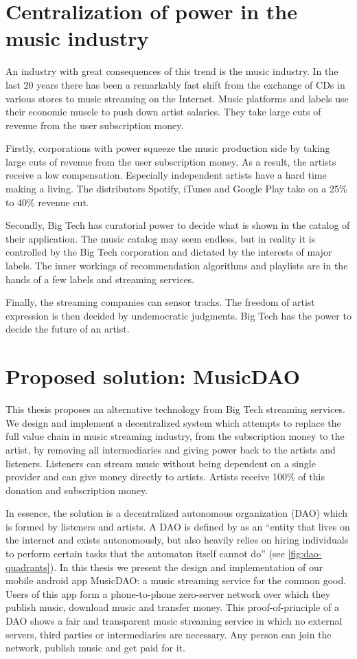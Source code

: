 \section{Centralization of power in the music industry}
An industry with great consequences of this trend is the music industry. In the last 20 years there has been a remarkably fast shift from the exchange of CDs in various stores to music streaming on the Internet. Music platforms and labels use their economic muscle to push down artist salaries. They take large cuts of revenue from the user subscription money.

Firstly, corporations with power squeeze the music production side by taking large cuts of revenue from the user subscription money. As a result, the artists receive a low compensation. Especially independent artists have a hard time making a living. The distributors Spotify, iTunes and Google Play take on a 25\% to 40\% revenue cut.

Secondly, Big Tech has curatorial power to decide what is shown in the catalog of their application. The music catalog may seem endless, but in reality it is controlled by the Big Tech corporation and dictated by the interests of major labels. The inner workings of recommendation algorithms and playlists are in the hands of a few labels and streaming services.

Finally, the streaming companies can sensor tracks. The freedom of artist expression is then decided by undemocratic judgments. Big Tech has the power to decide the future of an artist.

\section{Proposed solution: MusicDAO}
This thesis proposes an alternative technology from Big Tech streaming services. We design and implement a decentralized system which attempts to replace the full value chain in music streaming industry, from the subscription money to the artist, by removing all intermediaries and giving power back to the artists and listeners. Listeners can stream music without being dependent on a single provider and can give money directly to artists. Artists receive 100\% of this donation and subscription money.

In essence, the solution is a decentralized autonomous organization (DAO) which is formed by listeners and artists. A DAO is defined by \cite{buterin2014dao} as an ``entity that lives on the internet and exists autonomously, but also heavily relies on hiring individuals to perform certain tasks that the automaton itself cannot do'' (see \ref{fig:dao-quadrants}). In this thesis we present the design and implementation of our mobile android app MusicDAO: a music streaming service for the common good. Users of this app form a phone-to-phone zero-server network over which they publish music, download music and transfer money. This proof-of-principle of a DAO shows a fair and transparent music streaming service in which no external servers, third parties or intermediaries are necessary. Any person can join the network, publish music and get paid for it. 

